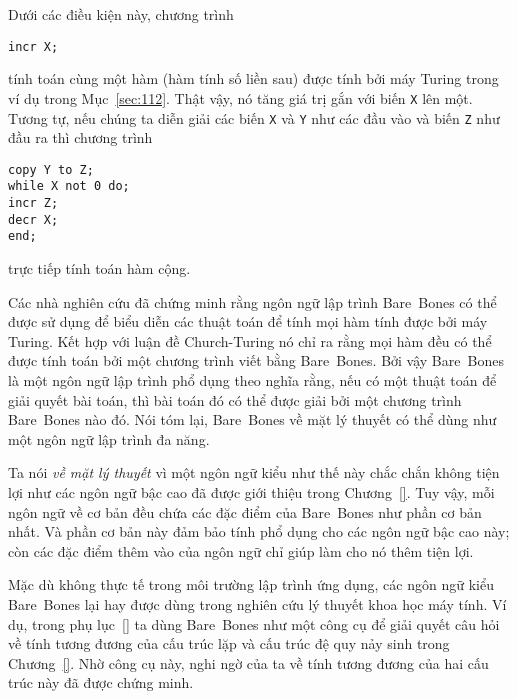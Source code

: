 Dưới các điều kiện này, chương trình
\begin{flushleft}
\qquad\qquad\qquad  \texttt{incr X;}
\end{flushleft}
tính toán cùng một hàm (hàm tính số liền sau) được tính bởi máy Turing trong ví dụ trong
Mục~\ref{sec:112}. Thật vậy, nó tăng giá trị gắn với biến \texttt{X} lên một. Tương tự,
nếu chúng ta diễn giải các biến \texttt{X} và \texttt{Y} như các đầu vào và biến
\texttt{Z} như đầu ra thì chương trình
\begin{flushleft}
  \qquad \qquad\qquad  \texttt{copy Y to Z;}\\
  \qquad \qquad\qquad \texttt{while X not 0 do;} \\
  \qquad \qquad\qquad \qquad \texttt{incr  Z;} \\
  \qquad \qquad\qquad \qquad \texttt{decr X;} \\
  \qquad \qquad\qquad \texttt{end;} \\
\end{flushleft}
trực tiếp tính toán hàm cộng.

Các nhà nghiên cứu đã chứng minh rằng ngôn ngữ lập trình Bare~Bones có thể được sử dụng để
biểu diễn các thuật toán để tính mọi hàm tính được bởi máy Turing. Kết hợp với luận đề
Church-Turing nó chỉ ra rằng mọi hàm đều có thể được tính toán bởi một chương trình viết
bằng Bare~Bones. Bởi vậy Bare~Bones là một ngôn ngữ lập trình phổ dụng theo nghĩa rằng,
nếu có một thuật toán để giải quyết bài toán, thì bài toán đó có thể được giải bởi một
chương trình Bare~Bones nào đó. Nói tóm lại, Bare~Bones về mặt lý thuyết có thể dùng như
một ngôn ngữ lập trình đa năng.

Ta nói \textit{về mặt lý thuyết} vì một ngôn ngữ kiểu như thế này chắc chắn không tiện lợi
như các ngôn ngữ bậc cao đã được giới thiệu trong Chương~\ref{}. Tuy vậy, mỗi ngôn ngữ về
cơ bản đều chứa các đặc điểm của Bare~Bones như phần cơ bản nhất. Và phần cơ bản này đảm
bảo tính phổ dụng cho các ngôn ngữ bậc cao này; còn các đặc điểm thêm vào của ngôn ngữ chỉ
giúp làm cho nó thêm tiện lợi.

Mặc dù không thực tế trong môi trường lập trình ứng dụng, các ngôn ngữ kiểu Bare~Bones lại
hay được dùng trong nghiên cứu lý thuyết khoa học máy tính. Ví dụ, trong phụ lục~\ref{} ta
dùng Bare~Bones như một công cụ để giải quyết câu hỏi về tính tương đương của cấu trúc lặp
và cấu trúc đệ quy nảy sinh trong Chương~\ref{}. Nhờ công cụ này, nghi ngờ của ta về tính
tương đương của hai cấu trúc này đã được chứng minh.

